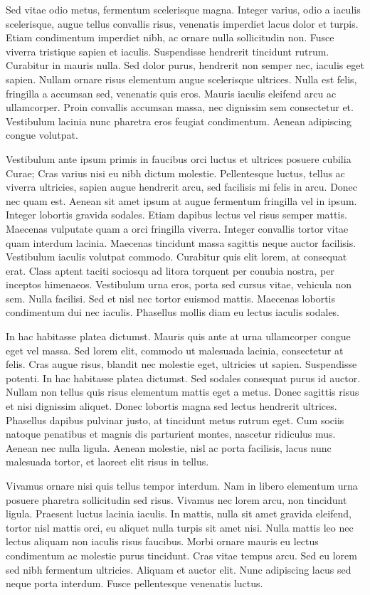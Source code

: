 \documentclass{book}
\begin{document}
Sed vitae odio metus, fermentum scelerisque magna. Integer varius, odio a
iaculis scelerisque, augue tellus convallis risus, venenatis imperdiet lacus
dolor et turpis. Etiam condimentum imperdiet nibh, ac ornare nulla sollicitudin
non. Fusce viverra tristique sapien et iaculis. Suspendisse hendrerit tincidunt
rutrum. Curabitur in mauris nulla. Sed dolor purus, hendrerit non semper nec,
iaculis eget sapien. Nullam ornare risus elementum augue scelerisque ultrices.
Nulla est felis, fringilla a accumsan sed, venenatis quis eros. Mauris iaculis
eleifend arcu ac ullamcorper. Proin convallis accumsan massa, nec dignissim sem
consectetur et. Vestibulum lacinia nunc pharetra eros feugiat condimentum.
Aenean adipiscing congue volutpat.


Vestibulum ante ipsum primis in faucibus orci luctus et ultrices posuere cubilia
Curae; Cras varius nisi eu nibh dictum molestie. Pellentesque luctus, tellus ac
viverra ultricies, sapien augue hendrerit arcu, sed facilisis mi felis in arcu.
Donec nec quam est. Aenean sit amet ipsum at augue fermentum fringilla vel in
ipsum. Integer lobortis gravida sodales. Etiam dapibus lectus vel risus semper
mattis. Maecenas vulputate quam a orci fringilla viverra. Integer convallis
tortor vitae quam interdum lacinia. Maecenas tincidunt massa sagittis neque
auctor facilisis. Vestibulum iaculis volutpat commodo. Curabitur quis elit lorem,
at consequat erat. Class aptent taciti sociosqu ad litora torquent per conubia
nostra, per inceptos himenaeos. Vestibulum urna eros, porta sed cursus vitae,
vehicula non sem. Nulla facilisi. Sed et nisl nec tortor euismod mattis.
Maecenas lobortis condimentum dui nec iaculis. Phasellus mollis diam eu lectus
iaculis sodales.


In hac habitasse platea dictumst. Mauris quis ante at urna ullamcorper congue
eget vel massa. Sed lorem elit, commodo ut malesuada lacinia, consectetur at
felis. Cras augue risus, blandit nec molestie eget, ultricies ut sapien.
Suspendisse potenti. In hac habitasse platea dictumst. Sed sodales consequat
purus id auctor. Nullam non tellus quis risus elementum mattis eget a metus.
Donec sagittis risus et nisi dignissim aliquet. Donec lobortis magna sed lectus
hendrerit ultrices. Phasellus dapibus pulvinar justo, at tincidunt metus rutrum
eget. Cum sociis natoque penatibus et magnis dis parturient montes, nascetur
ridiculus mus. Aenean nec nulla ligula. Aenean molestie, nisl ac porta
facilisis, lacus nunc malesuada tortor, et laoreet elit risus in tellus.


Vivamus ornare nisi quis tellus tempor interdum. Nam in libero elementum urna
posuere pharetra sollicitudin sed risus. Vivamus nec lorem arcu, non tincidunt
ligula. Praesent luctus lacinia iaculis. In mattis, nulla sit amet gravida
eleifend, tortor nisl mattis orci, eu aliquet nulla turpis sit amet nisi.
Nulla mattis leo nec lectus aliquam non iaculis risus faucibus. Morbi ornare
mauris eu lectus condimentum ac molestie purus tincidunt. Cras vitae tempus
arcu. Sed eu lorem sed nibh fermentum ultricies. Aliquam et auctor elit. Nunc
adipiscing lacus sed neque porta interdum. Fusce pellentesque venenatis luctus.
\end{document}
